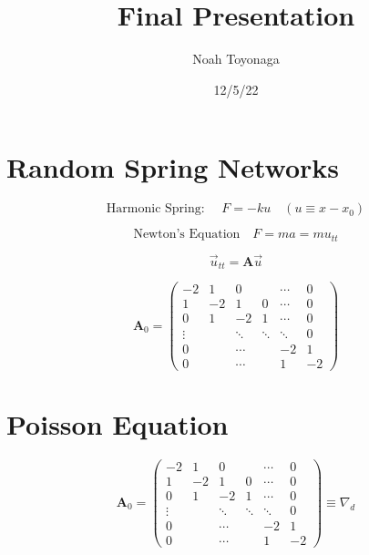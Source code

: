 \documentclass{article}
\title{Final Presentation}
\author{Noah Toyonaga}
\date{12/5/22}
\begin{document}
\maketitle

\section{Random Spring Networks}

\begin{equation}
	\text{Harmonic Spring: } \quad F = -k u \quad \left( u\equiv x - x_0\right)
\end{equation}


\begin{equation}
	\text{Newton's Equation} \quad F = m a = m u_{tt} 
\end{equation}

\begin{equation}
	\vec{u}_{tt} = \boldsymbol{A}\vec{u}
\end{equation}

\begin{equation}
	\boldsymbol{A}_0 = 
\begin{pmatrix}
	-2 & 1 & 0 & &\cdots & 0 \\
	1 & -2 & 1 & 0 & \cdots & 0 \\
	0 & 1 & -2 & 1 & \cdots & 0  \\
	\vdots & &\ddots& \ddots  & \ddots & 0\\
	0& & \cdots && -2 & 1\\
	0 & & \cdots & &1& -2
\end{pmatrix}
\end{equation}


\section{Poisson Equation}

\begin{equation}
	\boldsymbol{A}_0 = 
\begin{pmatrix}
	-2 & 1 & 0 & &\cdots & 0 \\
	1 & -2 & 1 & 0 & \cdots & 0 \\
	0 & 1 & -2 & 1 & \cdots & 0  \\
	\vdots & &\ddots& \ddots  & \ddots & 0\\
	0& & \cdots && -2 & 1\\
	0 & & \cdots & &1& -2
\end{pmatrix} \equiv \nabla_d
\end{equation}
\end{document}
